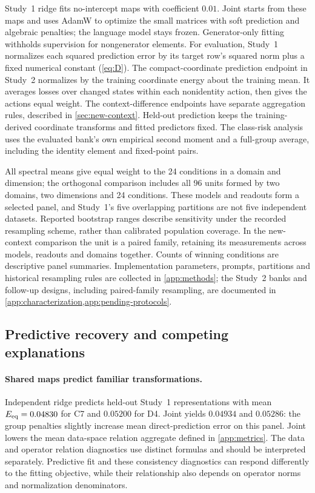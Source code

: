 \hypertarget{par:estimation}{}
Study~1 ridge fits no-intercept maps with coefficient $0.01$. Joint starts from these maps and uses AdamW \citep{loshchilov2019decoupled} to optimize the small matrices with soft prediction and algebraic penalties; the language model stays frozen. Generator-only fitting withholds supervision for nongenerator elements. For evaluation, Study~1 normalizes each squared prediction error by its target row's squared norm plus a fixed numerical constant (\cref{eq:D}). The compact-coordinate prediction endpoint in Study~2 normalizes by the training coordinate energy about the training mean. It averages losses over changed states within each nonidentity action, then gives the actions equal weight. The context-difference endpoints have separate aggregation rules, described in \cref{sec:new-context}. Held-out prediction keeps the training-derived coordinate transforms and fitted predictors fixed. The class-risk analysis uses the evaluated bank's own empirical second moment and a full-group average, including the identity element and fixed-point pairs.

All spectral means give equal weight to the 24 conditions in a domain and dimension; the orthogonal comparison includes all 96 units formed by two domains, two dimensions and 24 conditions. These models and readouts form a selected panel, and Study~1's five overlapping partitions are not five independent datasets. Reported bootstrap ranges describe sensitivity under the recorded resampling scheme, rather than calibrated population coverage. In the new-context comparison the unit is a paired family, retaining its measurements across models, readouts and domains together. Counts of winning conditions are descriptive panel summaries. Implementation parameters, prompts, partitions and historical resampling rules are collected in \cref{app:methods}; the Study~2 banks and follow-up designs, including paired-family resampling, are documented in \cref{app:characterization,app:pending-protocols}.

\subsection{Predictive recovery and competing explanations}
\label{sec:characterization}
\paragraph{Shared maps predict familiar transformations.}
Independent ridge predicts held-out Study~1 representations with mean $E_{\mathrm{eq}}=0.04830$ for C7 and $0.05200$ for D4. Joint yields $0.04934$ and $0.05286$: the group penalties slightly increase mean direct-prediction error on this panel. Joint lowers the mean data-space relation aggregate defined in \cref{app:metrics}. The data and operator relation diagnostics use distinct formulas and should be interpreted separately. Predictive fit and these consistency diagnostics can respond differently to the fitting objective, while their relationship also depends on operator norms and normalization denominators.


